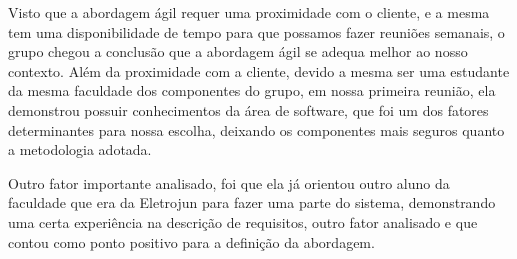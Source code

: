 Visto que a abordagem ágil requer uma proximidade com o cliente, e a mesma tem uma disponibilidade de tempo para que possamos fazer reuniões semanais, o grupo chegou a conclusão que a abordagem ágil se adequa melhor ao nosso contexto.
Além da proximidade com a cliente, devido a mesma ser uma estudante da mesma faculdade dos componentes do grupo, em nossa primeira reunião, ela demonstrou possuir conhecimentos da área de software, que foi um dos fatores determinantes para nossa escolha, deixando os componentes mais seguros quanto a metodologia adotada.

Outro fator importante analisado, foi que ela já orientou outro aluno da faculdade que era da Eletrojun para fazer uma parte do sistema, demonstrando uma certa experiência na descrição de requisitos, outro fator analisado e que contou como ponto positivo para a definição da abordagem.
